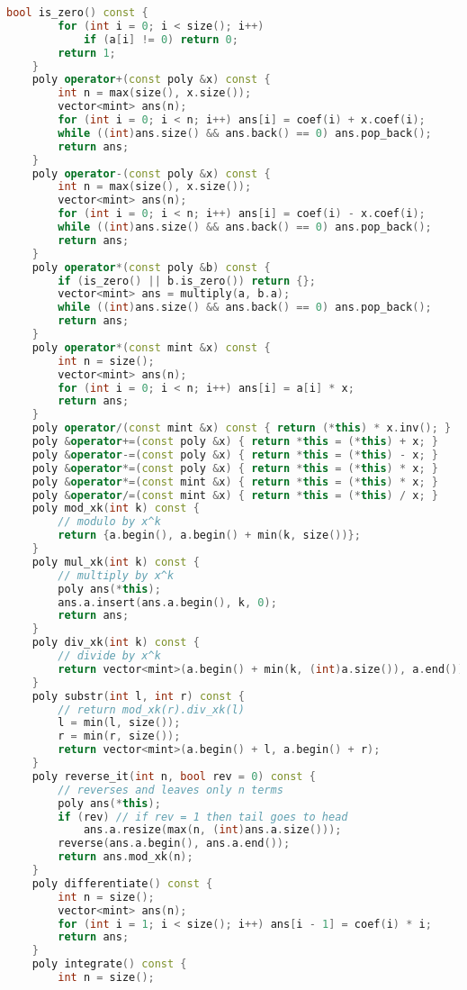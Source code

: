 \documentclass[10pt, a4paper, oneside]{book}
\begin{document}
\begin{lstlisting}[language=C++]
    bool is_zero() const {
        for (int i = 0; i < size(); i++)
            if (a[i] != 0) return 0;
        return 1;
    }
    poly operator+(const poly &x) const {
        int n = max(size(), x.size());
        vector<mint> ans(n);
        for (int i = 0; i < n; i++) ans[i] = coef(i) + x.coef(i);
        while ((int)ans.size() && ans.back() == 0) ans.pop_back();
        return ans;
    }
    poly operator-(const poly &x) const {
        int n = max(size(), x.size());
        vector<mint> ans(n);
        for (int i = 0; i < n; i++) ans[i] = coef(i) - x.coef(i);
        while ((int)ans.size() && ans.back() == 0) ans.pop_back();
        return ans;
    }
    poly operator*(const poly &b) const {
        if (is_zero() || b.is_zero()) return {};
        vector<mint> ans = multiply(a, b.a);
        while ((int)ans.size() && ans.back() == 0) ans.pop_back();
        return ans;
    }
    poly operator*(const mint &x) const {
        int n = size();
        vector<mint> ans(n);
        for (int i = 0; i < n; i++) ans[i] = a[i] * x;
        return ans;
    }
    poly operator/(const mint &x) const { return (*this) * x.inv(); }
    poly &operator+=(const poly &x) { return *this = (*this) + x; }
    poly &operator-=(const poly &x) { return *this = (*this) - x; }
    poly &operator*=(const poly &x) { return *this = (*this) * x; }
    poly &operator*=(const mint &x) { return *this = (*this) * x; }
    poly &operator/=(const mint &x) { return *this = (*this) / x; }
    poly mod_xk(int k) const {
        // modulo by x^k
        return {a.begin(), a.begin() + min(k, size())};
    }
    poly mul_xk(int k) const {
        // multiply by x^k
        poly ans(*this);
        ans.a.insert(ans.a.begin(), k, 0);
        return ans;
    }
    poly div_xk(int k) const {
        // divide by x^k
        return vector<mint>(a.begin() + min(k, (int)a.size()), a.end());
    }
    poly substr(int l, int r) const {
        // return mod_xk(r).div_xk(l)
        l = min(l, size());
        r = min(r, size());
        return vector<mint>(a.begin() + l, a.begin() + r);
    }
    poly reverse_it(int n, bool rev = 0) const {
        // reverses and leaves only n terms
        poly ans(*this);
        if (rev) // if rev = 1 then tail goes to head
            ans.a.resize(max(n, (int)ans.a.size()));
        reverse(ans.a.begin(), ans.a.end());
        return ans.mod_xk(n);
    }
    poly differentiate() const {
        int n = size();
        vector<mint> ans(n);
        for (int i = 1; i < size(); i++) ans[i - 1] = coef(i) * i;
        return ans;
    }
    poly integrate() const {
        int n = size();

\end{lstlisting}
\end{document}

